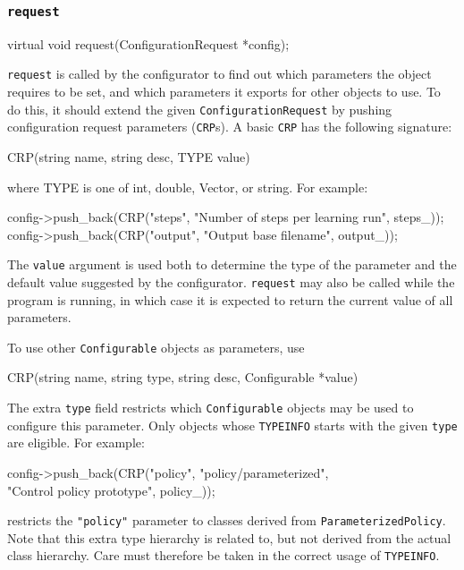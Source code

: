 \documentclass{article}
\newcommand{\txt}[1]{\texttt{#1}}
\newenvironment{code}{\alltt}{\endalltt}
\begin{document}
\subsubsection{\txt{request}}
\begin{code}
virtual void request(ConfigurationRequest *config);
\end{code}

\txt{request} is called by the configurator to find out which parameters the
object requires to be set, and which parameters it exports for other objects
to use. To do this, it should extend the given \txt{ConfigurationRequest}
by pushing configuration request parameters (\txt{CRP}s). A basic \txt{CRP}
has the following signature:

\begin{code}
CRP(string name, string desc, TYPE value)
\end{code}

where TYPE is one of int, double, Vector, or string. For example:

\begin{code}
config->push_back(CRP("steps", "Number of steps per learning run", steps_));
config->push_back(CRP("output", "Output base filename", output_));
\end{code}

The \txt{value} argument is used both to determine the type of the parameter
and the default value suggested by the configurator. \txt{request} may also
be called while the program is running, in which case it is expected to
return the current value of all parameters.

To use other \txt{Configurable} objects as parameters, use

\begin{code}
CRP(string name, string type, string desc, Configurable *value)
\end{code}

The extra \txt{type} field restricts which \txt{Configurable} objects may
be used to configure this parameter. Only objects whose \txt{TYPEINFO}
starts with the given \txt{type} are eligible. For example:

\begin{code}
config->push_back(CRP("policy", "policy/parameterized",\\
                      "Control policy prototype", policy_));
\end{code}

restricts the \txt{"policy"} parameter to classes derived from
\txt{ParameterizedPolicy}. Note that this extra type hierarchy is related
to, but not derived from the actual class hierarchy. Care must therefore be
taken in the correct usage of \txt{TYPEINFO}.
\end{document}
